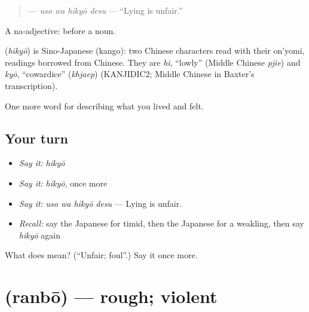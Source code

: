 \begin{quote}
\textbf{ } — \emph{uso wa hikyō desu} — \textquotedblleft{}Lying is unfair.\textquotedblright{}
\end{quote}

A na-adjective:  before a noun.

\begin{cousinweb}
\textbf{} (\emph{hikyō}) is Sino-Japanese (kango): two Chinese characters read with their on'yomi, readings borrowed from Chinese. They are \emph{hi}, \textquotedblleft{}lowly\textquotedblright{} (Middle Chinese \emph{pjie}) and \emph{kyō}, \textquotedblleft{}cowardice\textquotedblright{} (\emph{khjaep}) (KANJIDIC2; Middle Chinese in Baxter's transcription).
\end{cousinweb}

\begin{grammarlens}[title={What you've built}]
One more word for describing what you lived and felt.
\end{grammarlens}

\subsection*{Your turn}
\begin{itemize}
\raggedright
  \item \emph{Say it:} \emph{hikyō}
  \item \emph{Say it:} \emph{hikyō}, once more
  \item \emph{Say it:} \emph{uso wa hikyō desu} — Lying is unfair.
  \item \emph{Recall:} say the Japanese for timid, then the Japanese for a weakling, then say \emph{hikyō} again
\end{itemize}

\begin{tcolorbox}[breakable,colback=teal!4,colframe=teal!35!black,title={Before you move on}]
What does  mean? (\textquotedblleft{}Unfair; foul\textquotedblright{}.) Say it once more.
\end{tcolorbox}
\section[\texorpdfstring{\ja{らんぼう} (ranbō)}{らんぼう (ranbō)}]{ (ranbō) — rough; violent}

\label{lesson:JA-C439-ranbou}



